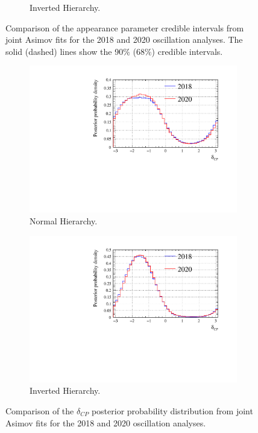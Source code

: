 \begin{figure}
\begin{subfigure}{.7\textwidth}
  \caption{Inverted Hierarchy.}
  \label{fig:20182020AppIH}
\end{subfigure}
\caption{Comparison of the appearance parameter credible intervals from joint Asimov fits for the 2018 and 2020 oscillation analyses. The solid (dashed) lines show the 90$\%$ ($68\%$) credible intervals.}
\label{fig:20182020App}
\end{figure}

\begin{figure}
\centering
\begin{subfigure}{.7\textwidth}
  \centering
  \includegraphics[width=0.95\linewidth]{figs/comparedmach3contours_2018vs2020Kevin/comparedmach3contours_RCeff_dcp_asimovA_NH}
  \caption{Normal Hierarchy.}
  \label{fig:20182020dcpNH}
\end{subfigure}
\begin{subfigure}{.7\textwidth}
  \centering
  \includegraphics[width=0.95\linewidth]{figs/comparedmach3contours_2018vs2020Kevin/comparedmach3contours_RCeff_dcp_asimovA_IH}
  \caption{Inverted Hierarchy.}
  \label{fig:20182020dcpIH}
\end{subfigure}
\caption{Comparison of the $\delta_{CP}$ posterior probability distribution from joint Asimov fits for the 2018 and 2020 oscillation analyses.}
\label{fig:20182020dcp}
\end{figure}

